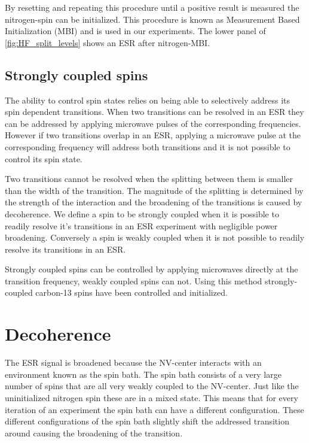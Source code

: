 By resetting and repeating this procedure until a positive result is measured the nitrogen-spin can be initialized.
This procedure is known as Measurement Based Initialization (MBI) and is used in our experiments.
The lower panel of \cref{fig:HF_split_levels} shows an ESR after nitrogen-MBI.

\subsection{Strongly coupled spins}
The ability to control spin states relies on being able to selectively address its spin dependent transitions.
When two transitions can be resolved in an ESR they can be addressed by applying microwave pulses of the corresponding frequencies.
However if two transitions overlap in an ESR, applying a microwave pulse at the corresponding frequency will address both transitions and it is not possible to control its spin state.

Two transitions cannot be resolved when the splitting between them is smaller than the width of the transition.
The magnitude of the splitting is determined by the strength of the interaction and the broadening of the transitions is caused by decoherence.
We define a spin to be strongly coupled when it is possible to readily resolve it's transitions in an ESR experiment with negligible power broadening.
Conversely a spin is weakly coupled when it is not possible to readily resolve its transitions in an ESR.

Strongly coupled spins can be controlled by applying microwaves directly at the transition frequency, weakly coupled spins can not.
Using this method strongly-coupled carbon-13 spins have been controlled and initialized\citep{Robledo2011HighFidelity}.

\section{Decoherence}
The ESR signal is broadened because the NV-center interacts with an environment known as the spin bath.
The spin bath consists of a very large number of spins that are all very weakly coupled to the NV-center.
Just like the uninitialized nitrogen spin these are in a mixed state.
This means that for every iteration of an experiment the spin bath can have a different configuration.
These different configurations of the spin bath slightly shift the addressed transition around causing the broadening of the transition.

